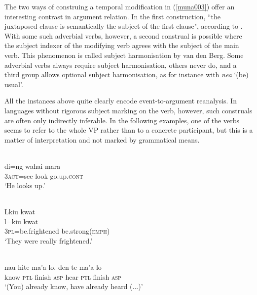 The two ways of construing a temporal modification in (\ref{muna003}) offer an interesting contrast in argument relation. In the first construction, ``the juxtaposed clause is semantically the subject of the first clause", according to \citet[236]{vandenberg1989}. With some such adverbial verbs, however, a second construal is possible where the subject indexer of the modifying verb agrees with the subject of the main verb. This phenomenon is called subject harmonisation by van den Berg. Some adverbial verbs always require subject harmonisation, others never do, and a third group allows optional subject harmonisation, as for instance with \textit{nea} `(be) usual'.

All the instances above quite clearly encode event-to-argument reanalysis. In languages without rigorous subject marking on the verb, however, such construals are often only indirectly inferable. In the following examples, one of the verbs seems to refer to the whole VP rather than to a concrete participant, but this is a matter of interpretation and not marked by grammatical means.

\ea \label{abui003}
\\
\gll di=ng wahai mara \\
3\textsc{act}=see look go.up.\textsc{cont} \\
\glft `He looks up.’\\ 
\z

\ea 
{}\\
\glll Lkiu kwat \\
l=kiu kwat \\
3\textsc{pl}=be.frightened be.strong(\textsc{emph}) \\
\glft `They were really frightened.' \\ 
\z

\ea \label{waimaqa007}
\\
\gll nau hite ma'a lo, den te ma'a lo \\
know \textsc{ptl} finish \textsc{asp} hear \textsc{ptl} finish \textsc{asp} \\
\glft `(You) already know, have already heard (...)'\\ 
\z

